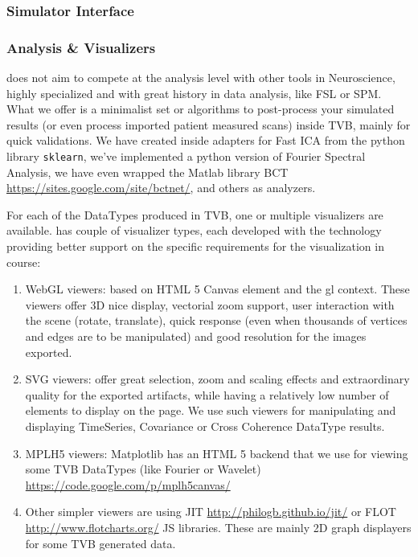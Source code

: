 	\subsubsection{Simulator Interface}
	
	\subsubsection{Analysis \& Visualizers}

\TVB does not aim to compete at the analysis level with other tools in Neuroscience, 
highly specialized and with great history in data analysis, like  FSL or SPM. 
What we offer is a minimalist set or algorithms to post-process your 
simulated results (or even process imported patient measured scans) inside TVB, mainly for quick validations.
We have created inside \TVB adapters for Fast ICA from the python library \texttt{sklearn}, 
we've implemented a python version of Fourier Spectral Analysis, 
we have even wrapped the Matlab library BCT \url{https://sites.google.com/site/bctnet/}, and others as analyzers.

For each of the DataTypes produced in TVB, one or multiple visualizers are available.	
\TVB has couple of  visualizer types, each developed with the technology providing better support on the specific requirements for the visualization in course:

\begin{enumerate}

	\item WebGL viewers: based on HTML 5 Canvas element and the gl context. 
	These viewers offer 3D nice display, vectorial zoom support, user interaction with the scene (rotate, translate), quick response 
	(even when thousands of vertices and edges are to be manipulated) and good resolution for the images exported.
	
	\item SVG viewers: offer great selection, zoom and scaling effects and extraordinary quality for the exported artifacts, while having 
	a relatively low number of elements to display on the page. 
	We use such viewers for manipulating and displaying TimeSeries, Covariance or Cross Coherence DataType results.
	
	\item MPLH5 viewers: Matplotlib has an HTML 5 backend that we use for viewing some TVB DataTypes (like Fourier or Wavelet)
	\url{https://code.google.com/p/mplh5canvas/}
	
	\item Other simpler viewers are using JIT \url{http://philogb.github.io/jit/} or FLOT \url{http://www.flotcharts.org/} JS libraries.
	These are mainly 2D graph displayers for some TVB generated data.

\end{enumerate}


